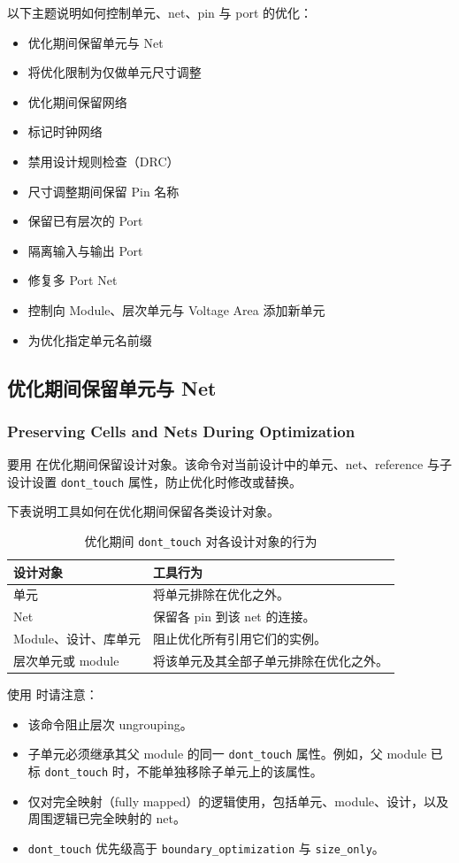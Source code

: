 以下主题说明如何控制单元、net、pin 与 port 的优化：
\begin{itemize}
  \item 优化期间保留单元与 Net
  \item 将优化限制为仅做单元尺寸调整
  \item 优化期间保留网络
  \item 标记时钟网络
  \item 禁用设计规则检查（DRC）
  \item 尺寸调整期间保留 Pin 名称
  \item 保留已有层次的 Port
  \item 隔离输入与输出 Port
  \item 修复多 Port Net
  \item 控制向 Module、层次单元与 Voltage Area 添加新单元
  \item 为优化指定单元名前缀
\end{itemize}

\subsection{优化期间保留单元与 Net}
\subsubsection*{Preserving Cells and Nets During Optimization}

要用  在优化期间保留设计对象。该命令对当前设计中的单元、net、reference 与子设计设置 \texttt{dont\_touch} 属性，防止优化时修改或替换。

下表说明工具如何在优化期间保留各类设计对象。

\begin{table}[htbp]
\centering
\caption{优化期间 \texttt{dont\_touch} 对各设计对象的行为}
\begin{tabularx}{\textwidth}{@{}l X@{}}
\toprule
\textbf{设计对象} & \textbf{工具行为} \\
\midrule
单元 & 将单元排除在优化之外。 \\
Net & 保留各 pin 到该 net 的连接。 \\
Module、设计、库单元 & 阻止优化所有引用它们的实例。 \\
层次单元或 module & 将该单元及其全部子单元排除在优化之外。 \\
\bottomrule
\end{tabularx}
\end{table}

使用  时请注意：
\begin{itemize}
  \item 该命令阻止层次 ungrouping。
  \item 子单元必须继承其父 module 的同一 \texttt{dont\_touch} 属性。例如，父 module 已标 \texttt{dont\_touch} 时，不能单独移除子单元上的该属性。
  \item 仅对完全映射（fully mapped）的逻辑使用，包括单元、module、设计，以及周围逻辑已完全映射的 net。
  \item \texttt{dont\_touch} 优先级高于 \texttt{boundary\_optimization} 与 \texttt{size\_only}。
\end{itemize}

